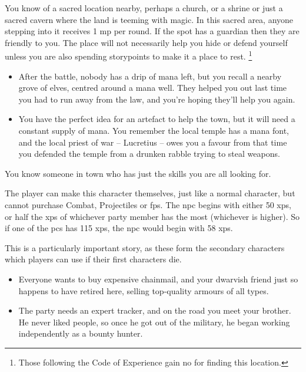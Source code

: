 \begin{multicols}{2}
You know of a sacred location nearby, perhaps a church, or a shrine or just a sacred cavern where the land is teeming with magic.
In this sacred area, anyone stepping into it receives 1 \gls{mp} per \gls{round}.
If the spot has a guardian then they are friendly to you.
The place will not necessarily help you hide or defend yourself unless you are also spending \glspl{storypoint} to make it a place to rest.
\footnote{Those following the Code of Experience gain no  for finding this location.}

\begin{itemize}
\item After the battle, nobody has a drip of mana left, but you recall a nearby grove of elves, centred around a mana well.
They helped you out last time you had to run away from the law, and you're hoping they'll help you again.
\item You have the perfect idea for an artefact to help the town, but it will need a constant supply of mana.
You remember the local temple has a mana font, and the local priest of war -- Lucretius -- owes you a favour from that time you defended the temple from a drunken rabble trying to steal weapons.
\end{itemize}

\label{oldFriend}
You know someone in town who has just the skills you are all looking for.

The player can make this character themselves, just like a normal character, but cannot purchase Combat, Projectiles or \glspl{fp}.
The \gls{npc} begins with either 50 \glspl{xp}, or half the \glspl{xp} of whichever party member has the most (whichever is higher).
So if one of the \glspl{pc} has 115 \glspl{xp}, the \gls{npc} would begin with 58 \glspl{xp}.

This is a particularly important story, as these form the secondary characters which players can use if their first characters die.

\begin{itemize}
\item Everyone wants to buy expensive chainmail, and your dwarvish friend just so happens to have retired here, selling top-quality armours of all types.
\item The party needs an expert tracker, and on the road you meet your brother.
He never liked people, so once he got out of the military, he began working independently as a bounty hunter.
\end{itemize}


\end{multicols}
